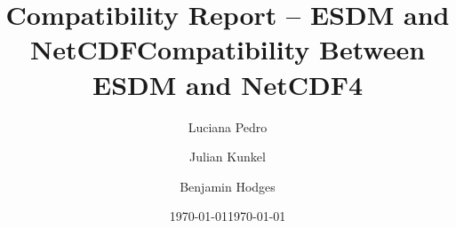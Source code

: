 \documentclass[a4paper,12pt]{esiwace-modified}
\title{Compatibility Report -- ESDM and NetCDF}
\author{
Luciana Pedro
\and Julian Kunkel
\and Benjamin Hodges
}
\date{\today} %
\begin{document}
\title{Compatibility Between ESDM and NetCDF4}
\date{\today}

\maketitle

\tableofcontents

\parskip 9pt


\newpage



\clearpage



\clearpage



\clearpage









\clearpage



\clearpage



\clearpage



\clearpage



\clearpage



% 

% 

\end{document}
